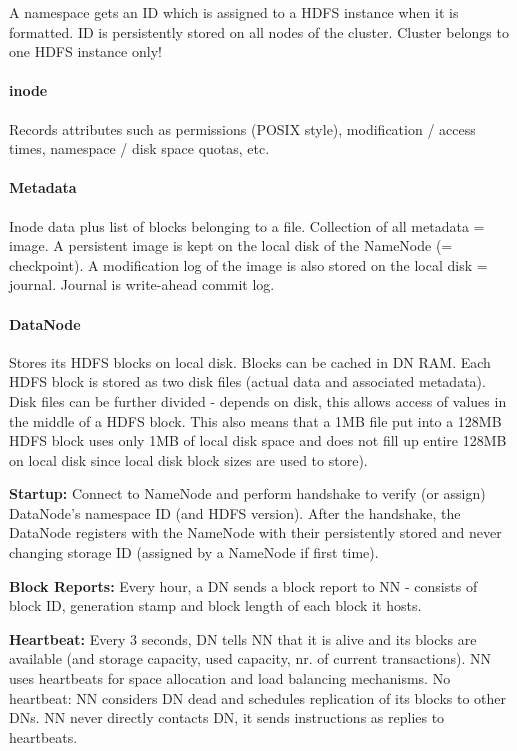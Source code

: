A namespace gets an ID which is assigned to a HDFS instance when it is formatted. ID is persistently stored on all nodes of the cluster. Cluster belongs to one HDFS instance only!

\paragraph{inode}
Records attributes such as permissions (POSIX style), modification / access times, namespace / disk space quotas, etc.

\paragraph{Metadata}
Inode data plus list of blocks belonging to a file. Collection of all metadata = image. A persistent image is kept on the local disk of the NameNode (= checkpoint). A modification log of the image is also stored on the local disk = journal. Journal is write-ahead commit log.

\paragraph{DataNode}
Stores its HDFS blocks on local disk. Blocks can be cached in DN RAM. Each HDFS block is stored as two disk files (actual data and associated metadata). Disk files can be further divided - depends on disk, this allows access of values in the middle of a HDFS block. This also means that a 1MB file put into a 128MB HDFS block uses only 1MB of local disk space and does not fill up entire 128MB on local disk since local disk block sizes are used to store).

\textbf{Startup:} Connect to NameNode and perform handshake to verify (or assign) DataNode's namespace ID (and HDFS version). After the handshake, the DataNode registers with the NameNode with their persistently stored and never changing storage ID (assigned by a NameNode if first time).

\textbf{Block Reports:} Every hour, a DN sends a block report to NN - consists of block ID, generation stamp and block length of each block it hosts.

\textbf{Heartbeat:} Every 3 seconds, DN tells NN that it is alive and its blocks are available (and storage capacity, used capacity, nr. of current transactions). NN uses heartbeats for space allocation and load balancing mechanisms. No heartbeat: NN considers DN dead and schedules replication of its blocks to other DNs. NN never directly contacts DN, it sends instructions as replies to heartbeats.

